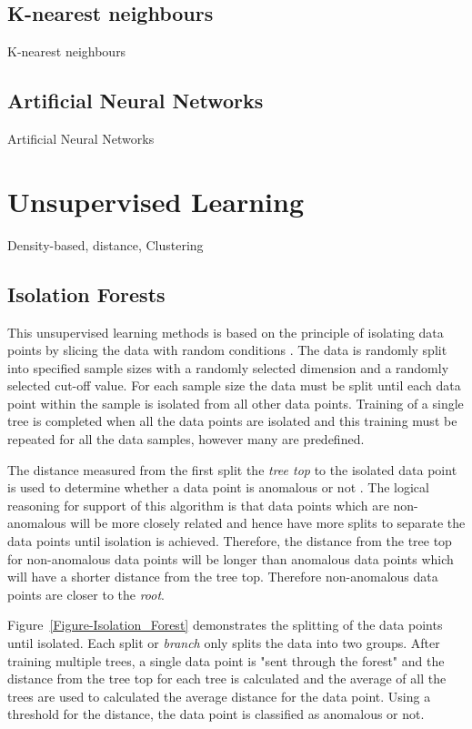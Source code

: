 \subsection{K-nearest neighbours}
K-nearest neighbours

\subsection{Artificial Neural Networks}
Artificial Neural Networks

\section{Unsupervised Learning}
Density-based, distance, Clustering

\subsection{Isolation Forests}
This unsupervised learning methods is based on the principle of isolating data points by slicing the data with random conditions \cite{TonyLiu2008}. The data is randomly split into specified sample sizes with a randomly selected dimension and a randomly selected cut-off value. For each sample size the data must be split until each data point within the sample is isolated from all other data points. Training of a single tree is completed when all the data points are isolated and this training must be repeated for all the data samples, however many are predefined. 

The distance measured from the first split the \emph{tree top} to the isolated data point is used to determine whether a data point is anomalous or not \cite{Hariri2021}. The logical reasoning for support of this algorithm is that data points which are non-anomalous will be more closely related and hence have more splits to separate the data points until isolation is achieved. Therefore, the distance from the tree top for non-anomalous data points will be longer than anomalous data points which will have a shorter distance from the tree top. Therefore non-anomalous data points are closer to the \emph{root}. 

Figure~\ref{Figure-Isolation_Forest} demonstrates the splitting of the data points until isolated. Each split or \emph{branch} only splits the data into two groups. After training multiple trees, a single data point is "sent through the forest" and the distance from the tree top for each tree is calculated and the average of all the trees are used to calculated the average distance for the data point. Using a threshold for the distance, the data point is classified as anomalous or not.

